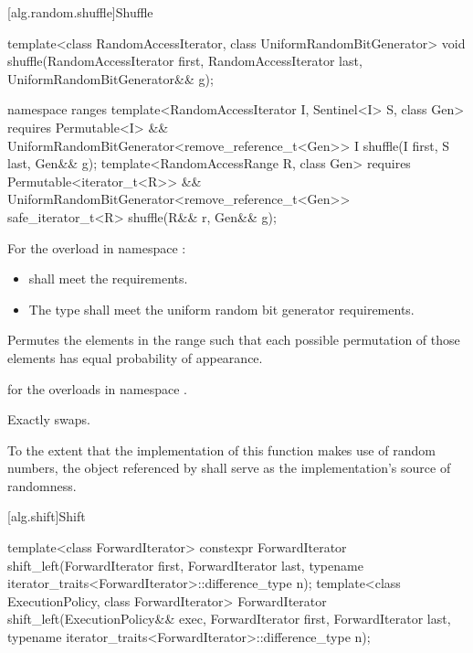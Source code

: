 [alg.random.shuffle]{Shuffle}

%
\begin{itemdecl}
template<class RandomAccessIterator, class UniformRandomBitGenerator>
  void shuffle(RandomAccessIterator first,
               RandomAccessIterator last,
               UniformRandomBitGenerator&& g);

namespace ranges {
  template<RandomAccessIterator I, Sentinel<I> S, class Gen>
    requires Permutable<I> &&
             UniformRandomBitGenerator<remove_reference_t<Gen>>
    I shuffle(I first, S last, Gen&& g);
  template<RandomAccessRange R, class Gen>
    requires Permutable<iterator_t<R>> &&
             UniformRandomBitGenerator<remove_reference_t<Gen>>
    safe_iterator_t<R> shuffle(R&& r, Gen&& g);
}
\end{itemdecl}

\begin{itemdescr}
\pnum
\requires
For the overload in namespace :
\begin{itemize}
\item
   shall meet
  the  requirements.
\item
  The type  shall meet
  the uniform random bit generator requirements.
\end{itemize}

\pnum
\effects
Permutes the elements in the range 
such that each possible permutation of those elements
has equal probability of appearance.

\pnum
\returns
{} for the overloads in namespace .

\pnum
\complexity
Exactly  swaps.

\pnum
\remarks
To the extent that the implementation of this function makes use
of random numbers, the object referenced by  shall serve as
the implementation's source of randomness.
\end{itemdescr}

[alg.shift]{Shift}

%
\begin{itemdecl}
template<class ForwardIterator>
  constexpr ForwardIterator
    shift_left(ForwardIterator first, ForwardIterator last,
               typename iterator_traits<ForwardIterator>::difference_type n);
template<class ExecutionPolicy, class ForwardIterator>
  ForwardIterator
    shift_left(ExecutionPolicy&& exec, ForwardIterator first, ForwardIterator last,
               typename iterator_traits<ForwardIterator>::difference_type n);
\end{itemdecl}

